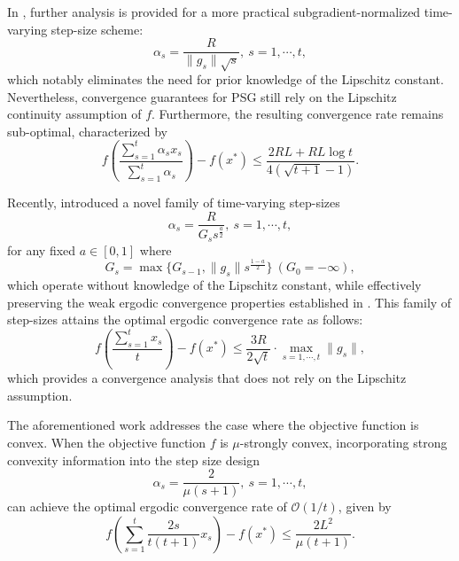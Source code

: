 \documentclass[sn-mathphys]{JORSC-jnl}%
\theoremstyle{thmstyleone}%
\theoremstyle{thmstylethree}%
\begin{document}
In \cite{nesterov2004lectures,nesterov2018lectures,beck2017first}, further analysis is provided for a more practical subgradient-normalized time-varying step-size scheme:
\begin{equation}
	\alpha_s=\frac{R}{\|g_s\|\sqrt{s}},~s=1,\cdots,t, \label{Nesterov}
\end{equation}
which notably eliminates the need for prior knowledge of the Lipschitz constant. Nevertheless, convergence guarantees for PSG still rely on the Lipschitz continuity assumption of $f$. Furthermore, the resulting convergence rate remains sub-optimal, characterized by
\begin{equation}\label{Nessub}
	f\left(\frac{\sum_{s=1}^t \alpha_s x_s}{\sum_{s=1}^t \alpha_s}\right)-f(x^*)\leq \frac{2RL+RL\log t}{4(\sqrt{t+1}-1)}.
\end{equation}

Recently, \cite{Xia} introduced a novel family of time-varying step-sizes
\begin{equation}
	\alpha_s=\frac{R}{G_s s^{\frac{a}{2}}}, ~s=1,\cdots,t,\label{size3}
\end{equation}
for any fixed $a \in [0,1]$ where 
\begin{equation}
	G_s = \max\{G_{s-1}, \|g_s\|s^{\frac{1-a}{2}}\} ~(G_0=-\infty), \label{G_s}
\end{equation}
which operate without knowledge of the Lipschitz constant, while effectively preserving the weak ergodic convergence properties established in \cite{Zhu}. This family of step-sizes attains the optimal ergodic convergence rate as follows:
\begin{equation}\label{conver}
	f\left(\frac{\sum_{s=1}^t x_s}{t}\right)-f(x^*)\leq
	\frac{3R}{2\sqrt{t}}\cdot \max_{s=1,\cdots,t}\|g_s\|,
\end{equation}
which provides a convergence analysis that does not rely on the Lipschitz assumption.

The aforementioned work addresses the case where the objective function is convex. When the objective function $f$ is $\mu$-strongly convex, incorporating strong convexity information into the step size design
\begin{equation}
	\alpha_s=\frac{2}{\mu(s+1)}, ~s=1,\cdots,t,\label{size4}
\end{equation}
can achieve the optimal ergodic convergence rate of $\mathcal{O}(1/t)$, given by \cite{Lacoste-Julien}
\begin{equation}\label{conver1}
	f\left(\sum_{s=1}^t\frac{2s}{t(t+1)}x_s\right)-f(x^*)\leq
	\frac{2L^2}{\mu(t+1)}.
\end{equation}
\end{document}
